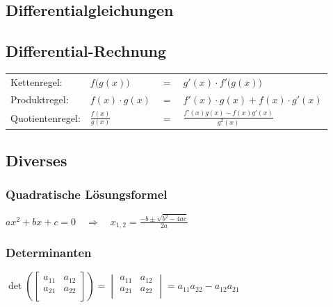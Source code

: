	
			
	\subsection{Differentialgleichungen}
		
	\subsection{Differential-Rechnung}
		\begin{tabular}{llll}
			Kettenregel:	& $f\big(g(x)\big)$ &$=$ & $g'(x)\cdot f'\big(g(x)\big)$\\[0.1cm]
			Produktregel:	& $f(x)\cdot g(x)$ &$=$ & $f'(x)\cdot g(x) + f(x)\cdot g'(x)$\\[0.1cm]
			Quotientenregel:& $\frac{f(x)}{g(x)}$ &$=$ & $\frac{f'(x)g(x)-f(x)g'(x)}{g^2(x)}$\\
		\end{tabular}
	\subsection{Diverses}	
	\begin{minipage}[t]{9.5cm}
		\subsubsection{Quadratische Lösungsformel}
			$ax^2+bx+c=0\quad\Rightarrow\quad x_{1,2}=\frac{-b\pm\sqrt{b^2-4ac}}{2a}$
	\end{minipage}
	\hfill
	\begin{minipage}[t]{9.5cm}
		\subsubsection{Determinanten}
			$\det\left(
			\begin{bmatrix}
				a_{11}&a_{12}\\
				a_{21}&a_{22}\\
			\end{bmatrix}\right)=
			\begin{vmatrix}
				a_{11}&a_{12}\\
				a_{21}&a_{22}\\
			\end{vmatrix}=a_{11}a_{22}-a_{12}a_{21}$
	\end{minipage}\\
	
